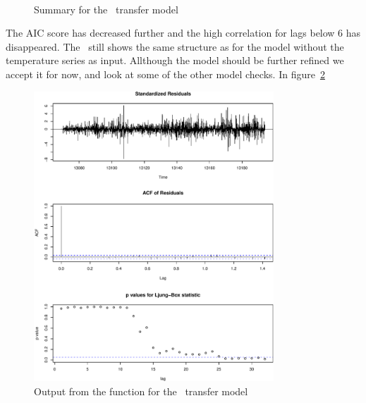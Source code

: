 \begin{figure}[!htb]
    \centering
    \mbox{ \quad 
          }
    \parbox{.8\textwidth}{}
    \caption{Summary for the \tfmtwo\ transfer model}
    \label{fig:tfm2-summary}
\end{figure}

The AIC score has decreased further and the high correlation for lags below 6 has disappeared. The \pacf\ still shows the same structure as for the model without the temperature series as input. Allthough the model should be further refined we accept it for now, and look at some of the other model checks. In figure~\ref{fig:tfm2-tsdiag}

\begin{figure}[ht]
    \centering
    \includegraphics[width=90mm]{../plots/tfm2-tsdiag.pdf}
    \caption{Output from the  function for the \tfmtwo\ transfer model}
    \label{fig:tfm2-tsdiag}
\end{figure}


